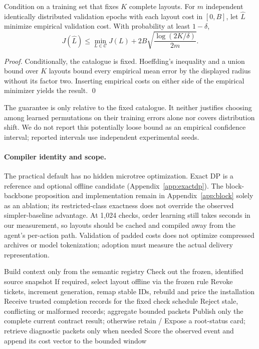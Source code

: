 \begin{proposition}\label{prop:valid}
Condition on a training set that fixes $K$ complete layouts. For $m$
independent identically distributed validation epochs with each layout cost in
$[0,B]$, let $\widehat L$ minimize empirical validation cost. With probability at
least $1-\delta$,
\begin{equation}J(\widehat L)\le\min_{L\in\mathcal C}J(L)+2B\sqrt{\frac{\log(2K/\delta)}{2m}}.\label{eq:valid}\end{equation}
\end{proposition}
\begin{proof}
Conditionally, the catalogue is fixed. Hoeffding's inequality and a union bound
over $K$ layouts bound every empirical mean error by the displayed radius
without its factor two. Inserting empirical costs on either side of the empirical
minimizer yields the result. \qed
\end{proof}
The guarantee is only relative to the fixed catalogue. It neither justifies
choosing among learned permutations on their training errors alone nor covers
distribution shift. We do not report this potentially loose bound as an empirical
confidence interval; reported intervals use independent experimental seeds.

\paragraph{Compiler identity and scope.}\label{sec:compiler-scope}
The practical default has no hidden microtree optimization. Exact DP is a
reference and optional offline candidate (Appendix~\ref{app:exactdp}). The
block-backbone proposition and implementation remain in Appendix~\ref{app:block}
solely as an ablation; its restricted-class exactness does not override the
observed simpler-baseline advantage. At 1{,}024 checks, order learning still
takes seconds in our measurement, so layouts should be cached and compiled away
from the agent's per-action path. Validation of padded costs does not optimize
compressed archives or model tokenization; adoption must measure the actual
delivery representation.

\begin{algorithm}[t]\caption{Deployable evidence control; inference and checking remain separate}\label{alg:control}
\begin{algorithmic}[1]
\State Build context only from the semantic registry
\State Check out the frozen, identified source snapshot
\State If required, select layout offline via the frozen rule
\State Revoke tickets, increment generation, remap stable IDs, rebuild and price the installation
\EndIf
\State Receive trusted completion records for the fixed check schedule
\State Reject stale, conflicting or malformed records; aggregate bounded packets
\State Publish only the complete current contract result; otherwise retain \FAIL/\UNKNOWN
\State Expose a root-status card; retrieve diagnostic packets only when needed
\State Score the observed event and append its cost vector to the bounded window
\EndFor
\end{algorithmic}\end{algorithm}

